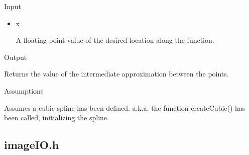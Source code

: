 \documentclass[pdftex, 11pt]{article}
\begin{document}
\begin{description}
\begin{description}
			\item{Input}

				\begin{itemize}

					\item{x}

						A floating point value of the desired location along the function.

				\end{itemize}

			\item{Output}

				Returns the value of the intermediate approximation between the points.

			\item{Assumptions}

				Assumes a cubic spline has been defined. a.k.a. the function createCubic() has
				been called, initializing the spline.

		\end{description}


\end{description}

\subsection{imageIO.h}
\end{document}
